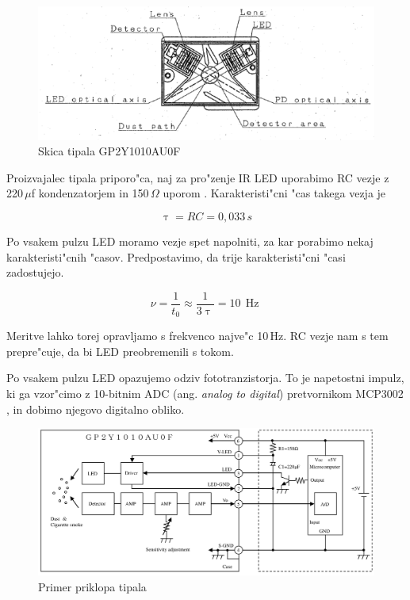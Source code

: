 \documentclass[11pt,a4paper]{article}
\DeclareMathOperator{\Hz}{Hz}
\begin{document}
\begin{figure}[H]
	\begin{center}
		\includegraphics[width=12cm]{sensor-scheme.png}
		\caption{Skica tipala GP2Y1010AU0F}
		\label{sensor-scheme}
	\end{center}
\end{figure}

Proizvajalec tipala priporo"ca, naj za pro"zenje IR LED uporabimo RC vezje z 220\,$\mu$f kondenzatorjem in 150\,$\Omega$ uporom \cite{sharp-gp2y1010au0f}. Karakteristi"cni "cas takega vezja je

$$
\uptau = RC = 0,033\,s
$$

Po vsakem pulzu LED moramo vezje spet napolniti, za kar porabimo nekaj karakteristi"cnih "casov. Predpostavimo, da trije karakteristi"cni "casi zadostujejo.

$$
\nu = \frac{1}{t_0} \approx \frac{1}{3 \uptau} = 10\,\Hz
$$

Meritve lahko torej opravljamo s frekvenco najve"c 10\,Hz. RC vezje nam s tem prepre"cuje, da bi LED preobremenili s tokom.

Po vsakem pulzu LED opazujemo odziv fototranzistorja. To je napetostni impulz, ki ga vzor"cimo z 10-bitnim ADC (ang. \textit{analog to digital}) pretvornikom MCP3002 \cite{mcp3002}, in dobimo njegovo digitalno obliko.

\begin{figure}[H]
	\begin{center}
		\includegraphics[width=12cm]{integration-scheme.png}
		\caption{Primer priklopa tipala}
		\label{integration-scheme}
	\end{center}
\end{figure}
\end{document}
